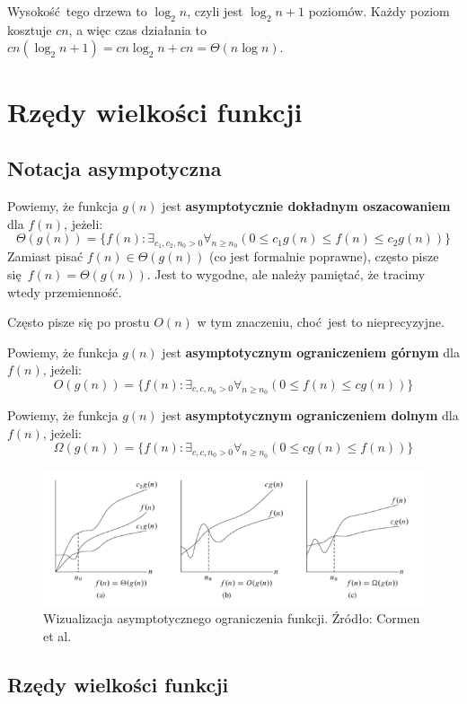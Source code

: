 \documentclass[10pt, oneside]{article}
\theoremstyle{remark}
\begin{document}
Wysokość tego drzewa to $\log_2 n$, czyli jest $\log_2 n + 1 $ poziomów.
Każdy poziom kosztuje $cn$, a więc czas działania to $cn(\log_2 n + 1) = cn \log_2 n + cn = \Theta(n \log n)$.

\section{Rzędy wielkości funkcji}

\subsection{Notacja asympotyczna}

Powiemy, że funkcja $g(n)$ jest \textbf{asymptotycznie dokładnym oszacowaniem} dla $f(n)$, jeżeli:
$$
\Theta(g(n)) = \{ f(n): \exists_{c_1, c_2, n_0>0} \forall_{n \geq n_0} \left( 0 \leq c_1 g(n) \leq f(n) \leq c_2 g(n) \right) \}
$$
Zamiast pisać $f(n) \in \Theta(g(n))$ (co jest formalnie poprawne), często pisze się $f(n) = \Theta(g(n))$.
Jest to wygodne, ale należy pamiętać, że tracimy wtedy przemienność.

Często pisze się po prostu $O(n)$ w tym znaczeniu, choć jest to nieprecyzyjne.

Powiemy, że funkcja $g(n)$ jest \textbf{asymptotycznym ograniczeniem górnym} dla $f(n)$, jeżeli:
$$
O(g(n)) = \{ f(n): \exists_{c, c, n_0>0} \forall_{n \geq n_0} \left(0 \leq f(n) \leq c g(n) \right) \}
$$

Powiemy, że funkcja $g(n)$ jest \textbf{asymptotycznym ograniczeniem dolnym} dla $f(n)$, jeżeli:
$$
\Omega(g(n)) = \{ f(n): \exists_{c, c, n_0>0} \forall_{n \geq n_0} \left(0 \leq c g(n) \leq f(n) \right) \}
$$

\begin{figure}
	\includegraphics{figures/big_o}
	\caption{Wizualizacja asymptotycznego ograniczenia funkcji. Źródło: Cormen et al.}
\end{figure}

\subsection{Rzędy wielkości funkcji}
\end{document}
